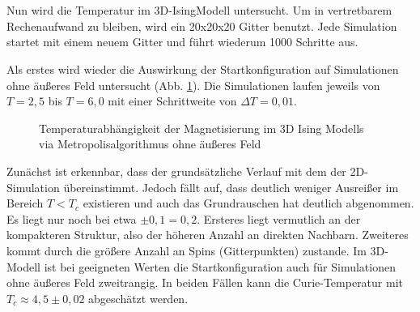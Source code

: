 \

\

Nun wird die Temperatur im 3D-IsingModell untersucht. Um in vertretbarem Rechenaufwand zu bleiben, wird ein 20x20x20 Gitter benutzt. Jede Simulation startet mit einem neuem Gitter und führt wiederum 1000 Schritte aus.


Als erstes wird wieder die Auswirkung der Startkonfiguration auf Simulationen ohne äußeres Feld untersucht (Abb. \ref{mp3d0modes}). Die Simulationen laufen jeweils von $T=2,5$ bis $T=6,0$ mit einer Schrittweite von $\Delta T= 0,01$.
\begin{figure}[H]
	\centering
	\caption{Temperaturabhängigkeit der Magnetisierung im 3D Ising Modells via Metropolisalgorithmus ohne äußeres Feld}
	\label{mp3d0modes}
\end{figure}
Zunächst ist erkennbar, dass der grundsätzliche Verlauf mit dem der 2D-Simulation übereinstimmt. Jedoch fällt auf, dass deutlich weniger Ausreißer im Bereich $T<T_{c}$ existieren und auch das Grundrauschen hat deutlich abgenommen. Es liegt nur noch bei etwa $\pm 0,1 = 0,2$. Ersteres liegt vermutlich an der kompakteren Struktur, also der höheren Anzahl an direkten Nachbarn. Zweiteres kommt durch die größere Anzahl an Spins (Gitterpunkten) zustande. Im 3D-Modell ist bei geeigneten Werten die Startkonfiguration auch für Simulationen ohne äußeres Feld zweitrangig. In beiden Fällen kann die Curie-Temperatur mit $T_{c}\approx 4,5\pm 0,02$ abgeschätzt werden.


